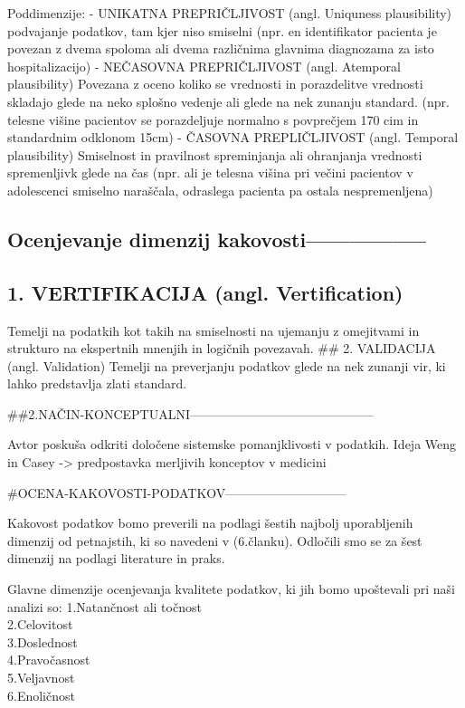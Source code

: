 \documentclass[
]{article}
\begin{document}
Poddimenzije: - UNIKATNA PREPRIČLJIVOST (angl. Uniquness plausibility)
podvajanje podatkov, tam kjer niso smiselni (npr. en identifikator
pacienta je povezan z dvema spoloma ali dvema različnima glavnima
diagnozama za isto hospitalizacijo) - NEČASOVNA PREPRIČLJIVOST (angl.
Atemporal plausibility) Povezana z oceno koliko se vrednosti in
porazdelitve vrednosti skladajo glede na neko splošno vedenje ali glede
na nek zunanju standard. (npr. telesne višine pacientov se porazdeljuje
normalno s povprečjem 170 cim in standardnim odklonom 15cm) - ČASOVNA
PREPLIČLJIVOST (angl. Temporal plausibility) Smiselnost in pravilnost
spreminjanja ali ohranjanja vrednosti spremenljivk glede na čas (npr.
ali je telesna višina pri večini pacientov v adolescenci smiselno
naraščala, odraslega pacienta pa ostala nespremenljena)

\subsection{Ocenjevanje dimenzij
kakovosti-----------------}\label{ocenjevanje-dimenzij-kakovosti}

\subsection{1. VERTIFIKACIJA (angl.
Vertification)}\label{vertifikacija-angl.-vertification}

Temelji na podatkih kot takih na smiselnosti na ujemanju z omejitvami in
strukturo na ekspertnih mnenjih in logičnih povezavah. \#\# 2.
VALIDACIJA (angl. Validation) Temelji na preverjanju podatkov glede na
nek zunanji vir, ki lahko predstavlja zlati standard.

\#\#2.NAČIN-KONCEPTUALNI--------------------------------------------

Avtor poskuša odkriti določene sistemske pomanjklivosti v podatkih.
Ideja Weng in Casey -\textgreater{} predpostavka merljivih konceptov v
medicini

\#OCENA-KAKOVOSTI-PODATKOV-----------------------------

Kakovost podatkov bomo preverili na podlagi šestih najbolj uporabljenih
dimenzij od petnajstih, ki so navedeni v (6.članku). Odločili smo se za
šest dimenzij na podlagi literature in praks.

Glavne dimenzije ocenjevanja kvalitete podatkov, ki jih bomo upoštevali
pri naši analizi so: 1.Natančnost ali točnost\\
2.Celovitost\\
3.Doslednost\\
4.Pravočasnost\\
5.Veljavnost\\
6.Enoličnost
\end{document}
